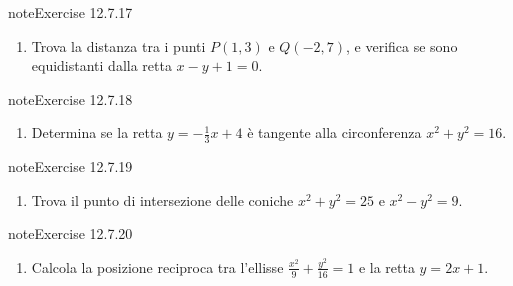 \documentclass[letterpaper,10pt,italian]{jupyterBook}
\begin{document}
\begin{sphinxadmonition}{note}{Exercise 12.7.17}


\begin{enumerate}
%
\setcounter{enumi}{16}
\item {} 
\sphinxAtStartPar
Trova la distanza tra i punti \( P(1, 3) \) e \( Q(-2, 7) \), e verifica se sono equidistanti dalla retta \( x - y + 1 = 0 \).

\end{enumerate}
\end{sphinxadmonition}
 \label{exercise:ch/analytic_geometry/analytic_geometry_2d/problems-exercise-17}

\begin{sphinxadmonition}{note}{Exercise 12.7.18}


\begin{enumerate}
%
\setcounter{enumi}{17}
\item {} 
\sphinxAtStartPar
Determina se la retta \( y = -\frac{1}{3}x + 4 \) è tangente alla circonferenza \( x^2 + y^2 = 16 \).

\end{enumerate}
\end{sphinxadmonition}
 \label{exercise:ch/analytic_geometry/analytic_geometry_2d/problems-exercise-18}

\begin{sphinxadmonition}{note}{Exercise 12.7.19}


\begin{enumerate}
%
\setcounter{enumi}{18}
\item {} 
\sphinxAtStartPar
Trova il punto di intersezione delle coniche \( x^2 + y^2 = 25 \) e \( x^2 - y^2 = 9 \).

\end{enumerate}
\end{sphinxadmonition}
 \label{exercise:ch/analytic_geometry/analytic_geometry_2d/problems-exercise-19}

\begin{sphinxadmonition}{note}{Exercise 12.7.20}


\begin{enumerate}
%
\setcounter{enumi}{19}
\item {} 
\sphinxAtStartPar
Calcola la posizione reciproca tra l’ellisse \( \frac{x^2}{9} + \frac{y^2}{16} = 1 \) e la retta \( y = 2x + 1 \).

\end{enumerate}
\end{sphinxadmonition}
\end{document}
